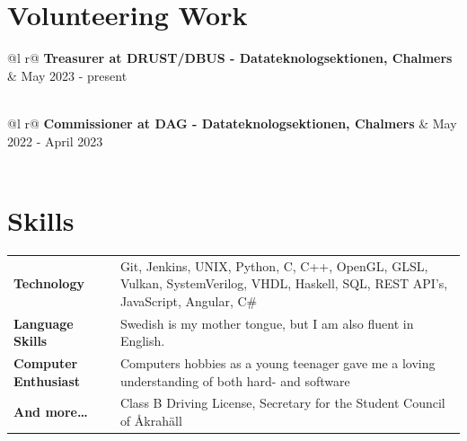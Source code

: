 \documentclass[a4paper,12pt]{article}
\begin{document}
\section{Volunteering Work}

\begin{tabularx}{\linewidth}{ @{}l r@{} }
    \textbf{Treasurer at \textbf{DRUST/DBUS - Datateknologsektionen, Chalmers}} & \hfill May 2023 - present \\[3.75pt]
      \\
    \end{tabularx}

\begin{tabularx}{\linewidth}{ @{}l r@{} }
\textbf{Commissioner at \textbf{DAG - Datateknologsektionen, Chalmers}} & \hfill May 2022 - April 2023  \\[3.75pt]
  \\
\end{tabularx}




\section{Skills}

\begin{tabularx}{\linewidth}{@{}l X@{}}
\textbf{Technology} &  \normalsize{Git, Jenkins, UNIX, Python, C, C++, OpenGL, GLSL, Vulkan, SystemVerilog, VHDL, Haskell, SQL, REST API's, JavaScript, Angular, C\#}\\
\textbf{Language Skills}  &  \normalsize{Swedish is my mother tongue, but I am also fluent in English.}\\
\textbf{Computer Enthusiast}  &  \normalsize{Computers hobbies as a young teenager gave me a loving understanding of both hard- and software} \\
\textbf{And more\dots}  &  \normalsize{Class B Driving License, Secretary for the Student Council of Åkrahäll}
\end{tabularx}

\vfill
\end{document}
